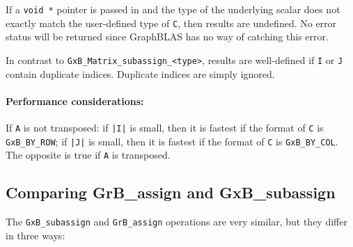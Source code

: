\documentclass[12pt]{article}
\begin{document}
If a \verb'void *' pointer is passed in and the type of the underlying scalar
does not exactly match the user-defined type of \verb'C', then results are
undefined.  No error status will be returned since GraphBLAS has no way of
catching this error.

In contrast to \verb'GxB_Matrix_subassign_<type>', results are well-defined if
\verb'I' or \verb'J' contain duplicate indices.  Duplicate indices
are simply ignored.

\paragraph{\bf Performance considerations:} %
If \verb'A' is not transposed: if \verb'|I|' is small, then it is fastest if
the format of \verb'C' is \verb'GxB_BY_ROW'; if \verb'|J|' is small, then it is
fastest if the format of \verb'C' is \verb'GxB_BY_COL'.  The opposite is true
if \verb'A' is transposed.

\newpage
\subsection{Comparing {\sf GrB\_assign} and {\sf GxB\_subassign}} %
\label{compare_assign}


The \verb'GxB_subassign' and \verb'GrB_assign' operations are very similar, but
they differ in three ways:
\end{document}

